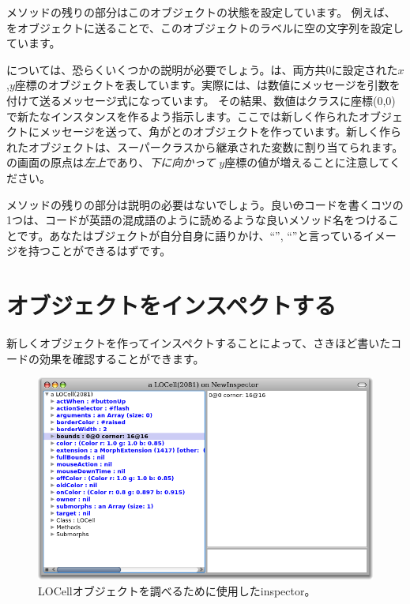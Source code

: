 \documentclass[a4paper,10pt,twoside]{book}
\begin{document}
メソッドの残りの部分はこのオブジェクトの状態を設定しています。
例えば、をオブジェクトに送ることで、このオブジェクトのラベルに空の文字列を設定しています。

については、恐らくいくつかの説明が必要でしょう。は、両方共0に設定された$x$,$y$座標のオブジェクトを表しています。実際には、は数値にメッセージを引数を付けて送るメッセージ式になっています。
その結果、数値はクラスに座標(0,0)で新たなインスタンスを作るよう指示します。ここでは新しく作られたオブジェクトにメッセージを送って、角がとのオブジェクトを作っています。新しく作られたオブジェクトは、スーパークラスから継承された変数に割り当てられます。
\pharo の画面の原点は\emph{左上}であり、\emph{下に向かって} $y$座標の値が増えることに注意してください。

メソッドの残りの部分は説明の必要はないでしょう。良い\st のコードを書くコツの1つは、コードが英語の混成語のように読めるような良いメソッド名をつけることです。あなたはブジェクトが自分自身に語りかけ、``'', ``''と言っているイメージを持つことができるはずです。

\section{オブジェクトをインスペクトする}

新しくオブジェクトを作ってインスペクトすることによって、さきほど書いたコードの効果を確認することができます。


\begin{figure}[htbp]
   \centering
   \includegraphics[width=\textwidth]{LOCellInspector}
   \caption{LOCellオブジェクトを調べるために使用したinspector。}
\end{figure}
\end{document}
